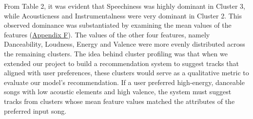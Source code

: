 \documentclass{article}
\begin{document}
From Table 2, it was evident that Speechiness was highly dominant in Cluster 3, while Acousticness and Instrumentalness were very dominant in Cluster 2. This observed dominance was substantiated by examining the mean values of the features (\hyperref[app:Cluster_profile]{Appendix F}). The values of the other four features, namely Danceability, Loudness, Energy and Valence were more evenly distributed across the remaining clusters. The idea behind cluster profiling was that when we extended our project to build a recommendation system to suggest tracks that aligned with user preferences, these clusters would serve as a qualitative metric to evaluate our model’s recommendation. If a user preferred high-energy, danceable songs with low acoustic elements and high valence, the system must suggest tracks from clusters whose mean feature values matched the attributes of the preferred input song.

\begin{table} [H]
\centering
{}
\\[1ex]
\caption{Cluster Profiling using the mean values of features for each cluster} 
\label{tab:template1}
\end{table}

\end{document}

